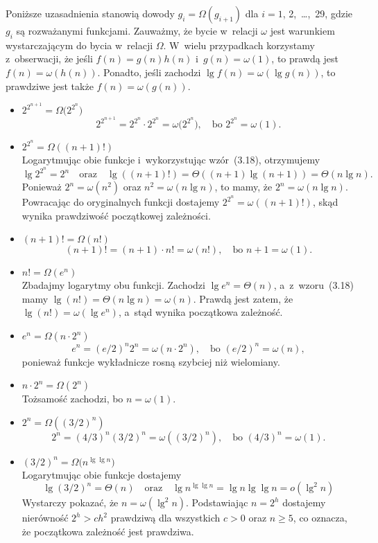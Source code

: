\subexercise{} %
Poniższe uzasadnienia stanowią dowody $g_i=\Omega(g_{i+1})$ dla $i=1$, 2,~\dots,~29, gdzie $g_i$ są rozważanymi funkcjami. Zauważmy, że bycie w~relacji $\omega$ jest warunkiem wystarczającym do bycia w~relacji $\Omega$. W~wielu przypadkach korzystamy z~obserwacji, że jeśli $f(n)=g(n)h(n)$ i~$g(n)=\omega(1)$, to prawdą jest $f(n)=\omega(h(n))$. Ponadto, jeśli zachodzi $\lg f(n)=\omega(\lg g(n))$, to prawdziwe jest także $f(n)=\omega(g(n))$.
\begin{itemize}
\item $2^{2^{n+1}}=\Omega\bigl(2^{2^n}\bigr)$
	\[
		2^{2^{n+1}} = 2^{2^n}\cdot2^{2^n} = \omega\bigl(2^{2^n}\bigr), \quad\text{bo $2^{2^n} = \omega(1)$}.
	\]
\item $2^{2^n}=\Omega((n+1)!)$ \\
	Logarytmując obie funkcje i~wykorzystując wzór~(3.18), otrzymujemy
	\[
		\lg 2^{2^n} = 2^n \quad\text{oraz}\quad \lg((n+1)!) = \Theta((n+1)\lg(n+1)) = \Theta(n\lg n).
	\]
	Ponieważ $2^n=\omega(n^2)$ oraz $n^2=\omega(n\lg n)$, to mamy, że $2^n=\omega(n\lg n)$. Powracając do oryginalnych funkcji dostajemy $2^{2^n}=\omega((n+1)!)$, skąd wynika prawdziwość początkowej zależności.
\item $(n+1)!=\Omega(n!)$
	\[
		(n+1)! = (n+1)\cdot n! = \omega(n!), \quad\text{bo $n+1 = \omega(1)$}.
	\]
\item $n!=\Omega(e^n)$ \\
	Zbadajmy logarytmy obu funkcji. Zachodzi $\lg e^n=\Theta(n)$, a~z~wzoru~(3.18) mamy $\lg(n!)=\Theta(n\lg n)=\omega(n)$. Prawdą jest zatem, że $\lg(n!)=\omega(\lg e^n)$, a~stąd wynika początkowa zależność.
\item $e^n=\Omega(n\cdot2^n)$
	\[
		e^n = (e/2)^n2^n = \omega(n\cdot2^n), \quad\text{bo $(e/2)^n = \omega(n)$},
	\]
	ponieważ funkcje wykładnicze rosną szybciej niż wielomiany.
\item $n\cdot2^n=\Omega(2^n)$ \\
	Tożsamość zachodzi, bo $n=\omega(1)$.
\item $2^n=\Omega((3/2)^n)$
	\[
		2^n = (4/3)^n(3/2)^n = \omega((3/2)^n), \quad\text{bo $(4/3)^n = \omega(1)$}.
	\]
\item $(3/2)^n=\Omega\bigl(n^{\lg\lg n}\bigr)$ \\
	Logarytmując obie funkcje dostajemy
	\[
		\lg(3/2)^n = \Theta(n) \quad\text{oraz}\quad \lg n^{\lg\lg n} = \lg n\lg\lg n = o(\lg^2n)
	\]
	Wystarczy pokazać, że $n=\omega(\lg^2n)$. Podstawiając $n=2^h$ dostajemy nierówność $2^h>ch^2$ prawdziwą dla wszystkich $c>0$ oraz $n\ge5$, co oznacza, że początkowa zależność jest prawdziwa.

\end{itemize}

